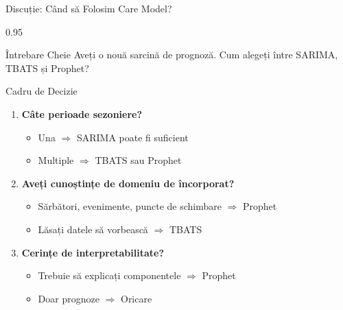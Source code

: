 \documentclass[9pt, aspectratio=169, t]{beamer}
\begin{document}
\begin{frame}{Discuție: Când să Folosim Care Model?}
    \begin{cminipage}{0.95\textwidth}
    {\small
    \begin{alertblock}{Întrebare Cheie}
        Aveți o nouă sarcină de prognoză. Cum alegeți între SARIMA, TBATS și Prophet?
    \end{alertblock}
    \begin{block}{Cadru de Decizie}
        \begin{enumerate}\setlength{\itemsep}{0pt}
            \item \textbf{Câte perioade sezoniere?}
                \begin{itemize}\setlength{\itemsep}{0pt}
                    \item Una $\Rightarrow$ SARIMA poate fi suficient
                    \item Multiple $\Rightarrow$ TBATS sau Prophet
                \end{itemize}
            \item \textbf{Aveți cunoștințe de domeniu de încorporat?}
                \begin{itemize}\setlength{\itemsep}{0pt}
                    \item Sărbători, evenimente, puncte de schimbare $\Rightarrow$ Prophet
                    \item Lăsați datele să vorbească $\Rightarrow$ TBATS
                \end{itemize}
            \item \textbf{Cerințe de interpretabilitate?}
                \begin{itemize}\setlength{\itemsep}{0pt}
                    \item Trebuie să explicați componentele $\Rightarrow$ Prophet
                    \item Doar prognoze $\Rightarrow$ Oricare
                \end{itemize}
        \end{enumerate}
    \end{block}
    }
    \end{cminipage}
\end{frame}
\end{document}

